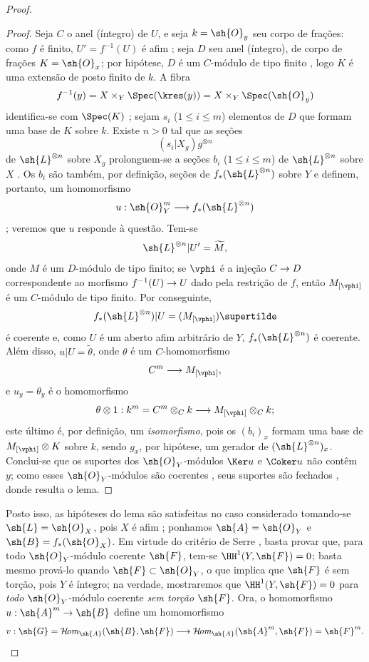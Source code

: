 \documentclass[oneside,10pt]{amsart}
\makeatletter
\renewcommand{\leq}{\leqslant}
\newcommand{\ega@arrow}[2]{\mathchoice{#1}{#2}{#2}{#2}}
\renewcommand{\to}{\ega@arrow{\longrightarrow}{\rightarrow}}
\def\shHom{\mathcal{H}\!\mathit{om}}
\makeatother
\begin{document}
\begin{proof}
\begin{proof}
Seja $C$ o anel (íntegro) de $U$, e seja $k=\sh{O}_y$ seu corpo de frações:
como $f$ é finito, $U'=f^{-1}(U)$ é afim ;
seja $D$ seu anel (íntegro), de corpo de frações $K=\sh{O}_x$;
por hipótese, $D$ é um $C$-módulo de tipo finito , logo $K$ é uma extensão de posto finito de $k$.
A fibra
\[
  f^{-1}(y)=X\times_Y\Spec(\kres(y))=X\times_Y\Spec(\sh{O}_y)
\]
identifica-se com $\Spec(K)$ ;
sejam $s_i$ ($1\leq i\leq m$) elementos de $D$ que formam uma base de $K$ sobre $k$.
Existe $n>0$ tal que as seções
\[
  (s_i|X_g)g^{\otimes n}
\]
de $\sh{L}^{\otimes n}$ sobre $X_g$ prolonguem-se a seções $b_i$ ($1\leq i\leq m$) de $\sh{L}^{\otimes n}$ sobre $X$ .
Os $b_i$ são também, por definição, seções de $f_*(\sh{L}^{\otimes n})$ sobre $Y$ e definem, portanto, um homomorfismo
\[
  u:\sh{O}_Y^m\to f_*(\sh{L}^{\otimes n})
\]
;
veremos que $u$ responde à questão.
Tem-se
\[
  \sh{L}^{\otimes n}|U'=\widetilde{M},
\]
onde $M$ é um $D$-módulo de tipo finito;
se $\vphi$ é a injeção $C\to D$ correspondente ao morfismo $f^{-1}(U)\to U$ dado pela restrição de $f$, então $M_{[\vphi]}$ é um $C$-módulo de tipo finito.
Por conseguinte,
\[
  f_*(\sh{L}^{\otimes n})|U=(M_{[\vphi]})\supertilde
\]
é coerente  e, como $U$ é um aberto afim arbitrário de $Y$, $f_*(\sh{L}^{\otimes n})$ é coerente.
Além disso, $u|U=\widetilde{\theta}$, onde $\theta$ é um $C$-homomorfismo
\[
  C^m\to M_{[\vphi]},
\]
e $u_y=\theta_y$ é o homomorfismo
\[
  \theta\otimes1:k^m=C^m\otimes_Ck\to M_{[\vphi]}\otimes_Ck;
\]
este último é, por definição, um \emph{isomorfismo}, pois os $(b_i)_x$ formam uma base de $M_{[\vphi]}\otimes K$ sobre $k$, sendo $g_x$, por hipótese, um gerador de $(\sh{L}^{\otimes n})_x$.
Conclui-se que os suportes dos $\sh{O}_Y$-módulos $\Ker u$ e $\Coker u$ não contêm $y$;
como esses $\sh{O}_Y$-módulos são coerentes , seus suportes são fechados , donde resulta o lema.
\end{proof}

Posto isso, as hipóteses do lema  são satisfeitas no caso considerado tomando-se $\sh{L}=\sh{O}_X$, pois $X$ é afim ;
ponhamos $\sh{A}=\sh{O}_Y$ e $\sh{B}=f_*(\sh{O}_X)$.
Em virtude do critério de Serre , basta provar que, para todo $\sh{O}_Y$-módulo coerente $\sh{F}$, tem-se $\HH^1(Y,\sh{F})=0$;
basta mesmo prová-lo quando $\sh{F}\subset\sh{O}_Y$, o que implica que $\sh{F}$ é sem torção, pois $Y$ é íntegro;
na verdade, mostraremos que $\HH^1(Y,\sh{F})=0$ para \emph{todo} $\sh{O}_Y$-módulo coerente \emph{sem torção} $\sh{F}$.
Ora, o homomorfismo $u:\sh{A}^m\to\sh{B}$ define um homomorfismo
\[
  v:\sh{G}=\shHom_{\sh{A}}(\sh{B},\sh{F})
  \to
  \shHom_{\sh{A}}(\sh{A}^m,\sh{F})
  =\sh{F}^m.
\]


\end{proof}
\end{document}
